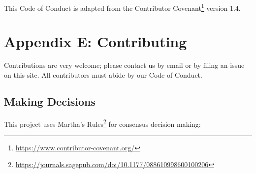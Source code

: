 \documentclass{scrbook}
\newcommand{\hreffoot}[2]{{#1}\footnote{\href{#2}{#2}}}
\begin{document}
This Code of Conduct is adapted from the \hreffoot{Contributor Covenant}{https://www.contributor-covenant.org/} version 1.4.

\chapter{Appendix E: Contributing}\label{contributing}


Contributions are very welcome;
please contact us by email or by filing an issue on this site.
All contributors must abide by our Code of Conduct.

\section*{Making Decisions}


This project uses \hreffoot{Martha's Rules}{https://journals.sagepub.com/doi/10.1177/088610998600100206} for consensus decision making:
\end{document}
